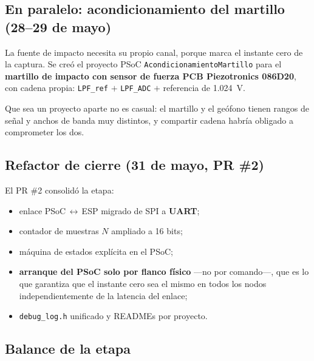 \subsection{En paralelo: acondicionamiento del martillo (28--29 de mayo)}

La fuente de impacto necesita su propio canal, porque marca el instante cero
de la captura. Se cre\'o el proyecto PSoC \texttt{AcondicionamientoMartillo}
para el \textbf{martillo de impacto con sensor de fuerza PCB Piezotronics 086D20}, con cadena
propia: \texttt{LPF\_ref} $+$ \texttt{LPF\_ADC} $+$ referencia de
\SI{1.024}{\volt}.

Que sea un proyecto aparte no es casual: el martillo y el ge\'ofono tienen
rangos de se\~nal y anchos de banda muy distintos, y compartir cadena habr\'ia
obligado a comprometer los dos.

\subsection{Refactor de cierre (31 de mayo, PR \#2)}

El PR \#2 consolid\'o la etapa:

\begin{itemize}[itemsep=0.2em]
\item enlace PSoC\,$\leftrightarrow$\,ESP migrado de SPI a \textbf{UART};
\item contador de muestras $N$ ampliado a 16 bits;
\item m\'aquina de estados expl\'icita en el PSoC;
\item \textbf{arranque del PSoC solo por flanco f\'isico} ---no por comando---,
que es lo que garantiza que el instante cero sea el mismo en todos los nodos
independientemente de la latencia del enlace;
\item \texttt{debug\_log.h} unificado y READMEs por proyecto.
\end{itemize}


\subsection{Balance de la etapa}

